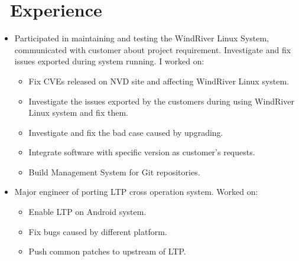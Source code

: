 \documentclass{resume}
\begin{document}
\section{\faUsers\ Experience}\normalsize
{}
\begin{itemize}
\item Participated in maintaining and testing the WindRiver Linux System, communicated with customer about project requirement. Investigate and fix issues exported during system running. I worked on:
  \begin{itemize}
    \item Fix CVEs released on NVD site and affecting WindRiver Linux system.
    \item Investigate the issues exported by the customers during using WindRiver Linux system and fix them.
    \item Investigate and fix the bad case caused by upgrading.
    \item Integrate software with specific version as customer's requests.
      \item Build Management System for Git repositories.
    \end{itemize}

  \end{itemize}


{}
\begin{itemize}
\item Major engineer of porting LTP cross operation system. Worked on:
  \begin{itemize}
  \item Enable LTP on Android system.
  \item Fix bugs caused by different platform.
  \item Push common patches to upstream of LTP.
  \end{itemize}
\end{itemize}
\end{document}
